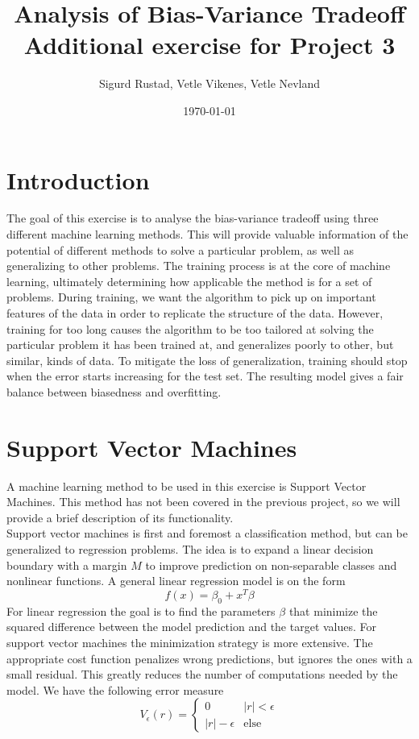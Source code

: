 \documentclass[a4paper]{article}
\begin{document}
	\title{\textbf{\huge{Analysis of Bias-Variance Tradeoff}\\ \large{Additional exercise for Project 3}}}
	
	\author{\textbf\large{Sigurd Rustad, Vetle Vikenes, Vetle Nevland}}
	
	\date{\today}
	
	
	\maketitle
	
	
	\section{Introduction}
	The goal of this exercise is to analyse the bias-variance tradeoff using three different machine learning methods. This will provide valuable information of the potential of different methods to solve a particular problem, as well as generalizing to other problems. The training process is at the core of machine learning, ultimately determining how applicable the method is for a set of problems. During training, we want the algorithm to pick up on important features of the data in order to replicate the structure of the data. However, training for too long causes the algorithm to be too tailored at solving the particular problem it has been trained at, and generalizes poorly to other, but similar, kinds of data. To mitigate the loss of generalization, training should stop when the error starts increasing for the test set. The resulting model gives a fair balance between biasedness and overfitting.
	
	\section{Support Vector Machines}
	A machine learning method to be used in this exercise is Support Vector Machines. This method has not been covered in the previous project, so we will provide a brief description of its functionality. \\
	
	Support vector machines is first and foremost a classification method, but can be generalized to regression problems. The idea is to expand a linear decision boundary with a margin $M$ to improve prediction on non-separable classes and nonlinear functions. A general linear regression model is on the form
	\[ f(x) = \beta_0 + x^T\beta \]
	For linear regression the goal is to find the parameters $\beta$ that minimize the squared difference between the model prediction and the target values. For support vector machines the minimization strategy is more extensive. The appropriate cost function penalizes wrong predictions, but ignores the ones with a small residual. This greatly reduces the number of computations needed by the model. We have the following error measure
	\[ V_{\epsilon}(r) = \begin{cases}
		0 & |r| < \epsilon \\
		|r| - \epsilon & \text{else}
	\end{cases} \]
	
\end{document}
